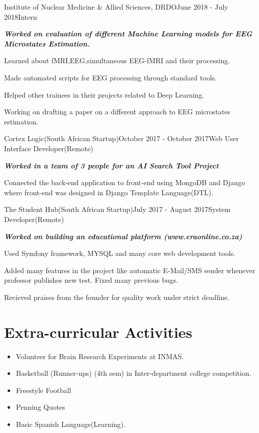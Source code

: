\documentclass[letterpaper]{twentysecondcv} %
\begin{document}
\begin{rSubsection}{Institute of Nuclear Medicine \& Allied Sciences, DRDO}{June 2018 - July 2018}{Intern}{}
	\item {\em \bf Worked on evaluation of different Machine Learning models for EEG Microstates Estimation.}
	\item Learned about fMRI,EEG,simultaneous EEG-fMRI and their processing.
	\item Made automated scripts for EEG processing through standard tools. 
	\item Helped other trainees in their projects related to Deep Learning.
	\item Working on drafting a paper on a different approach to EEG microstates estimation.
\end{rSubsection}

\begin{rSubsection}{Cortex Logic(South African Startup)}{October 2017 - October 2017}{Web User Interface Developer(Remote)}{}
	\item {\em \bf Worked in a team of 3 people for an AI Search Tool Project}
	\item Connected the back-end application to front-end using MongoDB and Django where front-end was designed in Django Template Language(DTL).
\end{rSubsection}


\begin{rSubsection}{The Student Hub(South African Startup)}{July 2017 - August 2017}{System Developer(Remote)}{}
	\item {\em \bf Worked on building an educational platform (www.eraonline.co.za)}
	\item Used Symfony framework, MYSQL and many core web development tools.
	\item Added many features in the project like automatic E-Mail/SMS sender
	whenever professor publishes new test. Fixed many previous bugs.
	\item Recieved praises from the founder for quality work under strict deadline.
	\\	
\end{rSubsection}

\section{Extra-curricular Activities}
\begin{itemize}
	\item Volunteer for Brain Research Experiments at INMAS.
	\item Basketball (Runner-ups) (4th sem) in Inter-department college competition.
	\item Freestyle Football
	\item Penning Quotes
	\item Basic Spanish Language(Learning).
\end{itemize}
\end{document}
